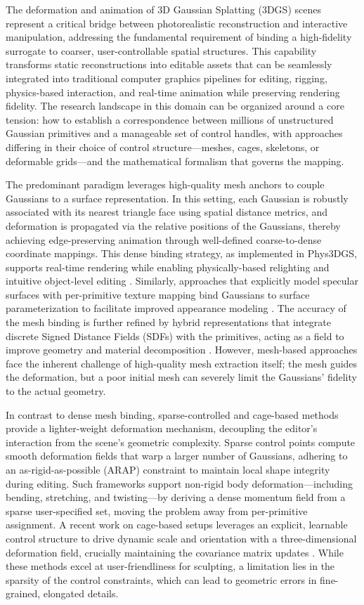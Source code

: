 \documentclass[11pt,a4paper]{article}
\begin{document}
The deformation and animation of 3D Gaussian Splatting (3DGS) scenes represent a critical bridge between photorealistic reconstruction and interactive manipulation, addressing the fundamental requirement of binding a high-fidelity surrogate to coarser, user-controllable spatial structures. This capability transforms static reconstructions into editable assets that can be seamlessly integrated into traditional computer graphics pipelines for editing, rigging, physics-based interaction, and real-time animation while preserving rendering fidelity. The research landscape in this domain can be organized around a core tension: how to establish a correspondence between millions of unstructured Gaussian primitives and a manageable set of control handles, with approaches differing in their choice of control structure---meshes, cages, skeletons, or deformable grids---and the mathematical formalism that governs the mapping.

The predominant paradigm leverages high-quality mesh anchors to couple Gaussians to a surface representation. In this setting, each Gaussian is robustly associated with its nearest triangle face using spatial distance metrics, and deformation is propagated via the relative positions of the Gaussians, thereby achieving edge-preserving animation through well-defined coarse-to-dense coordinate mappings. This dense binding strategy, as implemented in Phys3DGS, supports real-time rendering while enabling physically-based relighting and intuitive object-level editing \cite{arxiv:2409.10335v1}. Similarly, approaches that explicitly model specular surfaces with per-primitive texture mapping bind Gaussians to surface parameterization to facilitate improved appearance modeling \cite{arxiv:2506.13348v2}. The accuracy of the mesh binding is further refined by hybrid representations that integrate discrete Signed Distance Fields (SDFs) with the primitives, acting as a field to improve geometry and material decomposition \cite{arxiv:2507.15629v1}. However, mesh-based approaches face the inherent challenge of high-quality mesh extraction itself; the mesh guides the deformation, but a poor initial mesh can severely limit the Gaussians' fidelity to the actual geometry.

In contrast to dense mesh binding, sparse-controlled and cage-based methods provide a lighter-weight deformation mechanism, decoupling the editor's interaction from the scene's geometric complexity. Sparse control points compute smooth deformation fields that warp a larger number of Gaussians, adhering to an as-rigid-as-possible (ARAP) constraint to maintain local shape integrity during editing. Such frameworks support non-rigid body deformation---including bending, stretching, and twisting---by deriving a dense momentum field from a sparse user-specified set, moving the problem away from per-primitive assignment. A recent work on cage-based setups leverages an explicit, learnable control structure to drive dynamic scale and orientation with a three-dimensional deformation field, crucially maintaining the covariance matrix updates \cite{arxiv:2503.24366v1}. While these methods excel at user-friendliness for sculpting, a limitation lies in the sparsity of the control constraints, which can lead to geometric errors in fine-grained, elongated details.
\end{document}
